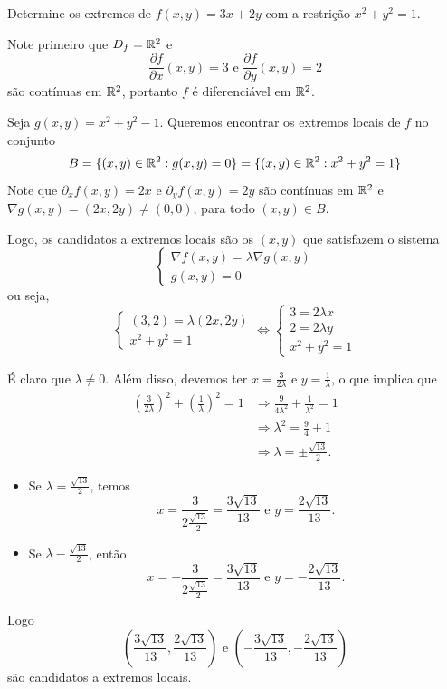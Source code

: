 \begin{example}
    Determine os extremos de \(f(x,y) = 3x + 2y\) com a restrição \(x^2 + y^2 = 1\).

    Note primeiro que \(D_f = \mathbb{R}^2\) e \[\frac{\partial f}{\partial x}(x,y) = 3 \text{ e } \frac{\partial f}{\partial y}(x,y) = 2\] são contínuas em \(\mathbb{R}^2\), portanto \(f\) é diferenciável em \(\mathbb{R}^2\).

    Seja \(g(x,y) = x^2 + y^2 - 1\). Queremos encontrar os extremos locais de \(f\) no conjunto \[B = \{(x,y)\in\mathbb{R}^2 : g(x,y) = 0\} = \{(x,y)\in\mathbb{R}^2 : x^2 + y^2 = 1 \}\] Note que \(\partial_x f(x,y) = 2x\) e \(\partial_y f(x,y) = 2y\) são contínuas em \(\mathbb{R}^2\) e \(\nabla g(x,y) = (2x,2y) \neq (0,0)\), para todo \((x,y)\in B\).

    Logo, os candidatos a extremos locais são os \((x,y)\) que satisfazem o sistema \[\begin{cases}
        \nabla f(x,y) = \lambda \nabla g(x,y) \\
        g(x,y) = 0
    \end{cases}\] ou seja, \[\begin{cases}
        (3,2) = \lambda (2x,2y) \\
        x^2 + y^2 = 1
    \end{cases} \Leftrightarrow \begin{cases}
        3 = 2\lambda x \\
        2 = 2\lambda y \\
        x^2 + y^2 = 1
    \end{cases}\]

    É claro que \(\lambda\neq 0\). Além disso, devemos ter \(x = \frac{3}{2\lambda}\) e \(y = \frac{1}{\lambda}\), o que implica que
        \begin{align*}
            \left( \frac{3}{2\lambda} \right)^2 + \left( \frac{1}{\lambda} \right)^2 = 1 & \Rightarrow \frac{9}{4\lambda^2} + \frac{1}{\lambda^2} = 1 \\
            & \Rightarrow \lambda^2 = \frac{9}{4} + 1 \\
            & \Rightarrow \lambda = \pm\frac{\sqrt{13}}{2}.
        \end{align*}
        \begin{itemize}
            \item Se \(\lambda = \frac{\sqrt{13}}{2}\), temos \[x = \frac{3}{2\frac{\sqrt{13}}{2}} = \frac{3\sqrt{13}}{13} \text{ e } y = \frac{2\sqrt{13}}{13}.\]
            \item Se \(\lambda - \frac{\sqrt{13}}{2}\), então \[x = -\frac{3}{2\frac{\sqrt{13}}{2}} = \frac{3\sqrt{13}}{13} \text{ e } y = -\frac{2\sqrt{13}}{13}.\]
        \end{itemize}
    Logo \[\left( \frac{3\sqrt{13}}{13}, \frac{2\sqrt{13}}{13} \right) \text{ e } \left( -\frac{3\sqrt{13}}{13}, -\frac{2\sqrt{13}}{13} \right)\] são candidatos a extremos locais.


\end{example}
